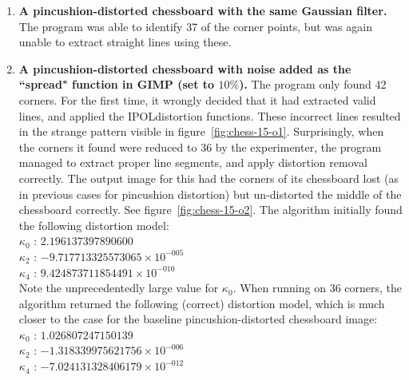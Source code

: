 \begin{enumerate}
  \item \textbf{A pincushion-distorted chessboard with the same Gaussian filter.} The program was able to identify 37 of the corner points, but was again unable to extract straight lines using these.
  \item \textbf{A pincushion-distorted chessboard with noise added as the ``spread" function in GIMP (set to $10\%$).} The program only found 42 corners. For the first time, it wrongly decided that it had extracted valid lines, and applied the IPOLdistortion functions. These incorrect lines resulted in the strange pattern visible in figure~\ref{fig:chess-15-o1}. Surprisingly, when the corners it found were reduced to 36 by the experimenter, the program managed to extract proper line segments, and apply distortion removal correctly. The output image for this had the corners of its chessboard lost (as in previous cases for pincushion distortion) but un-distorted the middle of the chessboard correctly. See figure~\ref{fig:chess-15-o2}. The algorithm initially found the following distortion model:\\
   $ \kappa_{0}$ : $2.196137397890600$\\
   $ \kappa_{2}$ : $-9.717713325573065 \times 10^{-005}$\\
   $ \kappa_{4}$ : $9.424873711854491 \times 10^{-010}$\\
Note the unprecedentedly large value for $\kappa_{0}$. When running on 36 corners, the algorithm returned the following (correct) distortion model, which is much closer to the case for the baseline pincushion-distorted chessboard image:\\
   $ \kappa_{0}$ : $1.026807247150139$\\
   $ \kappa_{2}$ : $-1.318339975621756 \times 10^{-006}$\\
   $ \kappa_{4}$ : $-7.024131328406179 \times 10^{-012}$
\begin{figure}[H]
  \centering

\end{figure}
\end{enumerate}
